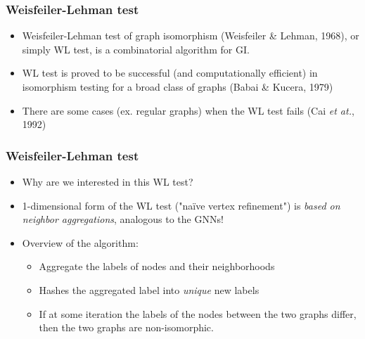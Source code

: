 \documentclass{beamer}
\begin{document}
\begin{frame}
\frametitle{Weisfeiler-Lehman test}

\begin{itemize}
	\item Weisfeiler-Lehman test of graph isomorphism (Weisfeiler \& Lehman, 1968), or simply WL test, is a combinatorial algorithm for \textsc{GI}. \pause
	
	\item WL test is proved to be successful (and computationally efficient) in isomorphism testing for a broad class of graphs (Babai \& Kucera, 1979) \pause
	
	\item There are some cases (ex. regular graphs) when the WL test fails (Cai {\it et at.}, 1992)
\end{itemize}

\end{frame}

\begin{frame}
\frametitle{Weisfeiler-Lehman test}

\begin{itemize}
	\item Why are we interested in this WL test? \pause
	
	\item 1-dimensional form of the WL test ("na\"ive vertex refinement") is {\it based on neighbor aggregations}, analogous to the GNNs! \pause
	
	\item Overview of the algorithm:
	\begin{itemize}
		\item Aggregate the labels of nodes and their neighborhoods
		\item Hashes the aggregated label into {\it unique} new labels
		\item If at some iteration the labels of the nodes between the two graphs differ, then the two graphs are non-isomorphic.
	\end{itemize}
	
\end{itemize}

\end{frame}
\end{document}
